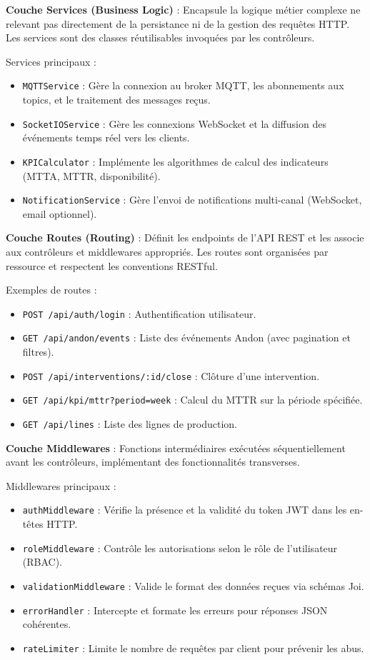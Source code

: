 \textbf{Couche Services (Business Logic)} : Encapsule la logique métier complexe ne relevant pas directement de la persistance ni de la gestion des requêtes HTTP. Les services sont des classes réutilisables invoquées par les contrôleurs.

Services principaux :
\begin{itemize}
    \item \texttt{MQTTService} : Gère la connexion au broker MQTT, les abonnements aux topics, et le traitement des messages reçus.
    \item \texttt{SocketIOService} : Gère les connexions WebSocket et la diffusion des événements temps réel vers les clients.
    \item \texttt{KPICalculator} : Implémente les algorithmes de calcul des indicateurs (MTTA, MTTR, disponibilité).
    \item \texttt{NotificationService} : Gère l'envoi de notifications multi-canal (WebSocket, email optionnel).
\end{itemize}


\textbf{Couche Routes (Routing)} : Définit les endpoints de l'API REST et les associe aux contrôleurs et middlewares appropriés. Les routes sont organisées par ressource et respectent les conventions RESTful.

Exemples de routes :
\begin{itemize}
    \item \texttt{POST /api/auth/login} : Authentification utilisateur.
    \item \texttt{GET /api/andon/events} : Liste des événements Andon (avec pagination et filtres).
    \item \texttt{POST /api/interventions/:id/close} : Clôture d'une intervention.
    \item \texttt{GET /api/kpi/mttr?period=week} : Calcul du MTTR sur la période spécifiée.
    \item \texttt{GET /api/lines} : Liste des lignes de production.
\end{itemize}

\textbf{Couche Middlewares} : Fonctions intermédiaires exécutées séquentiellement avant les contrôleurs, implémentant des fonctionnalités transverses.

Middlewares principaux :
\begin{itemize}
    \item \texttt{authMiddleware} : Vérifie la présence et la validité du token JWT dans les en-têtes HTTP.
    \item \texttt{roleMiddleware} : Contrôle les autorisations selon le rôle de l'utilisateur (RBAC).
    \item \texttt{validationMiddleware} : Valide le format des données reçues via schémas Joi.
    \item \texttt{errorHandler} : Intercepte et formate les erreurs pour réponses JSON cohérentes.
    \item \texttt{rateLimiter} : Limite le nombre de requêtes par client pour prévenir les abus.
\end{itemize}

